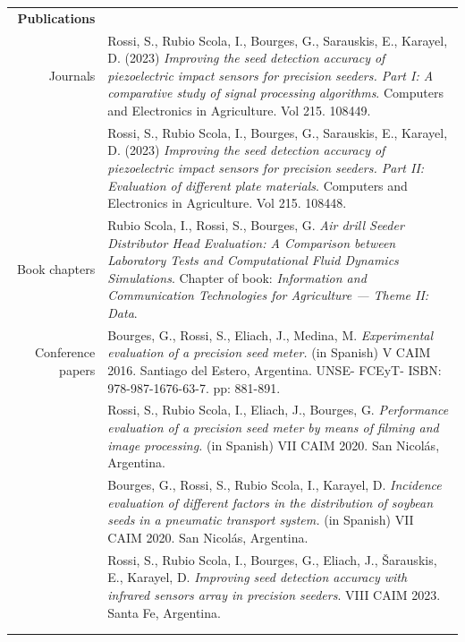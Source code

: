 \documentclass[a4paper,10pt, sans]{article}
\begin{document}
\begin{table}[H]
\begin{tabularx}{\textwidth}{r X}
    \textbf{Publications} & {}\\ [1ex]
      {Journals} & {Rossi, S., Rubio Scola, I., Bourges, G., Sarauskis, E., Karayel, D. (2023) \textit{Improving the seed detection accuracy of piezoelectric impact sensors for precision seeders. Part I: A comparative study of signal processing algorithms}. Computers and Electronics in Agriculture. Vol 215. 108449.} \\ [1ex]
      {} & {Rossi, S., Rubio Scola, I., Bourges, G., Sarauskis, E., Karayel, D. (2023) \textit{Improving the seed detection accuracy of piezoelectric impact sensors for precision seeders. Part II: Evaluation of different plate materials}. Computers and Electronics in Agriculture. Vol 215. 108448.} \\ 
      {Book chapters} & {Rubio Scola, I., Rossi, S., Bourges, G. \textit{Air drill Seeder Distributor Head Evaluation: A Comparison between Laboratory Tests and Computational Fluid Dynamics Simulations}. Chapter of book: \textit{Information and Communication Technologies for Agriculture — Theme II: Data}.} \\
      {Conference papers} & Bourges, G., Rossi, S., Eliach, J., Medina, M. \textit{Experimental evaluation of a precision seed meter.} (in Spanish) V CAIM 2016. Santiago del Estero, Argentina. UNSE- FCEyT- ISBN: 978-987-1676-63-7. pp: 881-891. \\  [1ex]
      {} & Rossi, S., Rubio Scola, I., Eliach, J., Bourges, G. \textit{Performance evaluation of a precision seed meter by means of filming and image processing.} (in Spanish) VII CAIM 2020. San Nicolás, Argentina. \\  [1ex]
      {} & Bourges, G., Rossi, S., Rubio Scola, I., Karayel, D. \textit{Incidence evaluation of different factors in the distribution of soybean seeds in a pneumatic transport system.} (in Spanish)  VII CAIM 2020. San Nicolás, Argentina.  \\  [1ex]
      {} & {Rossi, S., Rubio Scola, I., Bourges, G., Eliach, J., Šarauskis, E., Karayel, D. \textit{Improving seed detection accuracy with infrared sensors array in precision seeders}. VIII CAIM 2023. Santa Fe, Argentina.} \\ \\ \hline \\
    
    
    

\end{tabularx}
\end{table}
\end{document}

